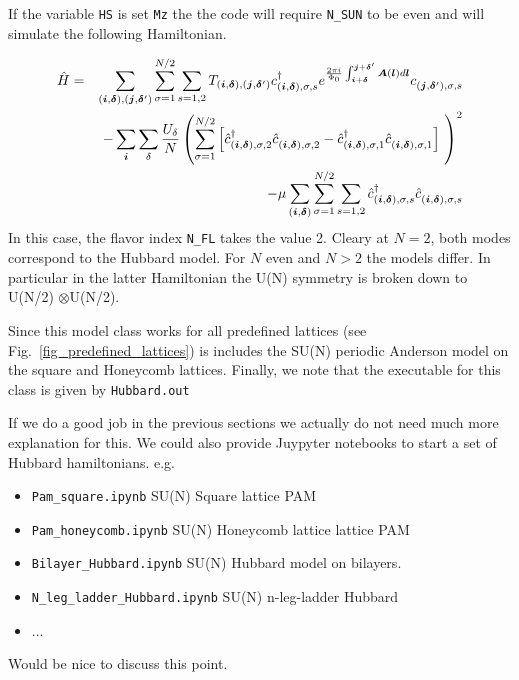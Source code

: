If the variable  \texttt{HS}  is set \texttt{Mz} the the code    will require  \texttt{N\_SUN}  to be even and will simulate the following Hamiltonian. 

\begin{eqnarray}
\hat{H}= & & \sum_{(\ve{i},\ve{\delta}), (\ve{j},\ve{\delta}')}  \sum_{\sigma =1}^{N/2}  \sum_{s=1,2} T_{(\ve{i},\ve{\delta}), (\ve{j},\ve{\delta}')}    c^{\dagger}_{(\ve{i},\ve{\delta}), \sigma,s }   e^{\frac{2 \pi i}{\Phi_0} \int_{\ve{i} + \ve{\delta}}^{\ve{j} + \ve{\delta}'}  
     \vec{A}(\ve{l})  d \ve{l}} c^{}_{(\ve{j},\ve{\delta}'),\sigma,s}     \nonumber   \\
    & & - \sum_{\vec{i}} \sum_{\delta}   \frac{U_\delta}{N} \left(\sum_{\sigma=1}^{N/2}  \left[   \hat{c}^{\dagger}_{(\vec{i},\ve{\delta}),\sigma, 2} 
    \hat{c}^{\phantom\dagger}_{(\vec{i}, \ve{\delta}),\sigma,2 }  -  \hat{c}^{\dagger}_{(\vec{i},\ve{\delta}),\sigma, 1} 
    \hat{c}^{\phantom\dagger}_{(\vec{i}, \ve{\delta}),\sigma,1} \right] \right)^2  \nonumber \\
    & & - \mu \sum_{(\ve{i},\ve{\delta})}  \sum_{\sigma =1}^{N/2}  \sum_{s=1,2}\hat{c}^{\dagger}_{(\vec{i},\ve{\delta}),\sigma, s} \hat{c}^{\phantom\dagger}_{(\vec{i},\ve{\delta}),\sigma, s} 
\end{eqnarray}
In this case, the flavor index \texttt{N\_FL}   takes the value 2. Cleary at $N=2$, both modes  correspond  to the Hubbard model.  For $N$  even and $N > 2$  the models differ.  In particular  in the latter  Hamiltonian the U(N) symmetry is broken down to  U(N/2) $\otimes $U(N/2).  

Since this model class  works for all predefined lattices  (see Fig.~\ref{fig_predefined_lattices})  is includes the SU(N) periodic Anderson model on   the square and Honeycomb lattices.     Finally,  we note that the executable for this class is given by \texttt{Hubbard.out}

{\color{red}  If we do a good job in the previous sections we actually do not need much more explanation for this.   We could also provide Juypyter notebooks to start a set of Hubbard  hamiltonians.  e.g.  
\begin{itemize}
\item   \texttt{Pam\_square.ipynb}            SU(N) Square lattice PAM 
\item  \texttt{Pam\_honeycomb.ipynb}     SU(N) Honeycomb lattice lattice PAM 
\item  \texttt{Bilayer\_Hubbard.ipynb}      SU(N) Hubbard model on bilayers.
\item  \texttt{N\_leg\_ladder\_Hubbard.ipynb}   SU(N) n-leg-ladder  Hubbard
\item ...
\end{itemize} 
Would be nice to discuss this point.}



